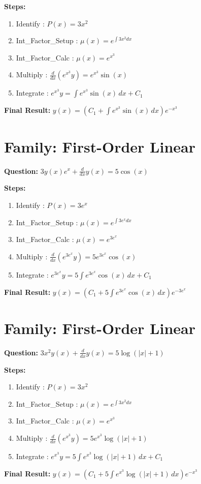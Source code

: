 \documentclass{article}
\begin{document}
\textbf{Steps:}
\begin{enumerate}
\item Identify :  $P(x) = 3 x^{2}$
\item Int_Factor_Setup :  $\mu(x) = e^{\int 3 x^{2} dx}$
\item Int_Factor_Calc :  $\mu(x) = e^{x^{3}}$
\item Multiply :  $\frac{d}{dx}(e^{x^{3}}y) = e^{x^{3}} \sin{\left(x \right)}$
\item Integrate :  $e^{x^{3}}y = \int e^{x^{3}} \sin{\left(x \right)}\, dx + C_1$
\end{enumerate}
\textbf{Final Result:} $y{\left(x \right)} = \left(C_{1} + \int e^{x^{3}} \sin{\left(x \right)}\, dx\right) e^{- x^{3}}$

\section*{Family: First-Order Linear}
\textbf{Question:} $3 y{\left(x \right)} e^{x} + \frac{d}{d x} y{\left(x \right)} = 5 \cos{\left(x \right)}$

\textbf{Steps:}
\begin{enumerate}
\item Identify :  $P(x) = 3 e^{x}$
\item Int_Factor_Setup :  $\mu(x) = e^{\int 3 e^{x} dx}$
\item Int_Factor_Calc :  $\mu(x) = e^{3 e^{x}}$
\item Multiply :  $\frac{d}{dx}(e^{3 e^{x}}y) = 5 e^{3 e^{x}} \cos{\left(x \right)}$
\item Integrate :  $e^{3 e^{x}}y = 5 \int e^{3 e^{x}} \cos{\left(x \right)}\, dx + C_1$
\end{enumerate}
\textbf{Final Result:} $y{\left(x \right)} = \left(C_{1} + 5 \int e^{3 e^{x}} \cos{\left(x \right)}\, dx\right) e^{- 3 e^{x}}$

\section*{Family: First-Order Linear}
\textbf{Question:} $3 x^{2} y{\left(x \right)} + \frac{d}{d x} y{\left(x \right)} = 5 \log{\left(\left|{x}\right| + 1 \right)}$

\textbf{Steps:}
\begin{enumerate}
\item Identify :  $P(x) = 3 x^{2}$
\item Int_Factor_Setup :  $\mu(x) = e^{\int 3 x^{2} dx}$
\item Int_Factor_Calc :  $\mu(x) = e^{x^{3}}$
\item Multiply :  $\frac{d}{dx}(e^{x^{3}}y) = 5 e^{x^{3}} \log{\left(\left|{x}\right| + 1 \right)}$
\item Integrate :  $e^{x^{3}}y = 5 \int e^{x^{3}} \log{\left(\left|{x}\right| + 1 \right)}\, dx + C_1$
\end{enumerate}
\textbf{Final Result:} $y{\left(x \right)} = \left(C_{1} + 5 \int e^{x^{3}} \log{\left(\left|{x}\right| + 1 \right)}\, dx\right) e^{- x^{3}}$
\end{document}
